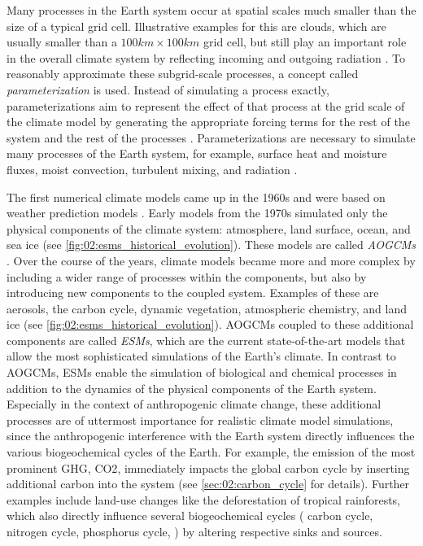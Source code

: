 Many processes in the Earth system occur at spatial scales much smaller than
the size of a typical grid cell. Illustrative examples for this are clouds,
which are usually smaller than a $100 \unit{km} \times 100 \unit{km}$ grid
cell, but still play an important role in the overall climate system by
reflecting incoming and outgoing radiation \autocite{Boucher2013}. To
reasonably approximate these subgrid-scale processes, a concept called
\emph{parameterization} is used. Instead of simulating a process exactly,
parameterizations aim to represent the effect of that process at the grid scale
of the climate model by generating the appropriate forcing terms for the rest
of the system and the rest of the processes \autocite{Gettelman2016}.
Parameterizations are necessary to simulate many processes of the Earth system,
for example, surface heat and moisture fluxes, moist convection, turbulent
mixing, and radiation \autocite{Holton2004}.

The first numerical climate models came up in the 1960s and were based on
weather prediction models \autocite{Flato2011}. Early models from the 1970s
simulated only the physical components of the climate system: atmosphere, land
surface, ocean, and sea ice (see \cref{fig:02:esms_historical_evolution}).
These models are called \emph{\acfp{AOGCM}} \autocite{Flato2013}. Over the
course of the years, climate models became more and more complex by including a
wider range of processes within the components, but also by introducing new
components to the coupled system. Examples of these are aerosols, the carbon
cycle, dynamic vegetation, atmospheric chemistry, and land ice (see
\cref{fig:02:esms_historical_evolution}). \Acp{AOGCM} coupled to these
additional components are called \emph{\acfp{ESM}}, which are the current
state-of-the-art models that allow the most sophisticated simulations of the
Earth's climate. In contrast to \acp{AOGCM}, \acp{ESM} enable the simulation of
biological and chemical processes in addition to the dynamics of the physical
components of the Earth system. Especially in the context of anthropogenic
climate change, these additional processes are of uttermost importance for
realistic climate model simulations, since the anthropogenic interference with
the Earth system directly influences the various biogeochemical cycles of the
Earth. For example, the emission of the most prominent \ac{GHG}, \ac{CO2},
immediately impacts the global carbon cycle by inserting additional carbon into
the system (see \cref{sec:02:carbon_cycle} for details). Further examples
include land-use changes like the deforestation of tropical rainforests, which
also directly influence several biogeochemical cycles (\eg{} carbon cycle,
nitrogen cycle, phosphorus cycle, \etc{}) by altering respective sinks and
sources.

